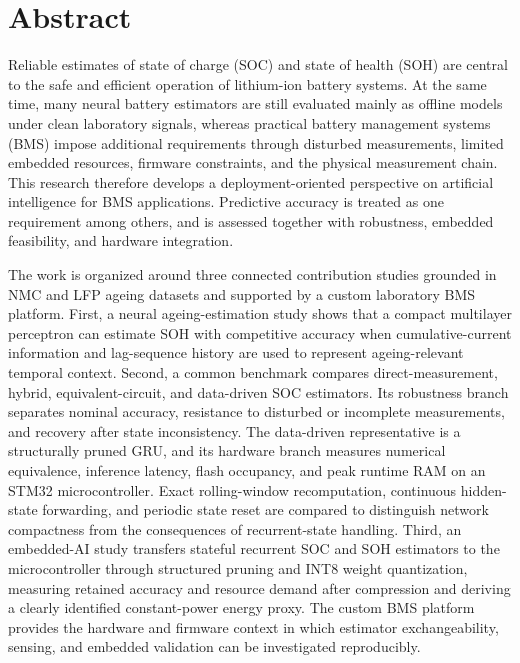 \documentclass[
    a4paper,
    12pt,
    titlepage,
    bibliography=totoc,
    twoside=on,
    parskip=false,
    numbers=noenddot,
    cleardoublepage=empty,
    DIV=12,
    BCOR=12.0mm,
    headheight=36pt,
    headings=openright
]{scrreprt}
\begin{document}
\chapter*{Abstract}
Reliable estimates of state of charge (SOC) and state of health (SOH) are central to the safe and efficient operation of lithium-ion battery systems. At the same time, many neural battery estimators are still evaluated mainly as offline models under clean laboratory signals, whereas practical battery management systems (BMS) impose additional requirements through disturbed measurements, limited embedded resources, firmware constraints, and the physical measurement chain. This research therefore develops a deployment-oriented perspective on artificial intelligence for BMS applications. Predictive accuracy is treated as one requirement among others, and is assessed together with robustness, embedded feasibility, and hardware integration.

The work is organized around three connected contribution studies grounded in NMC and LFP ageing datasets and supported by a custom laboratory BMS platform. First, a neural ageing-estimation study shows that a compact multilayer perceptron can estimate SOH with competitive accuracy when cumulative-current information and lag-sequence history are used to represent ageing-relevant temporal context. Second, a common benchmark compares direct-measurement, hybrid, equivalent-circuit, and data-driven SOC estimators. Its robustness branch separates nominal accuracy, resistance to disturbed or incomplete measurements, and recovery after state inconsistency. The data-driven representative is a structurally pruned GRU, and its hardware branch measures numerical equivalence, inference latency, flash occupancy, and peak runtime RAM on an STM32 microcontroller. Exact rolling-window recomputation, continuous hidden-state forwarding, and periodic state reset are compared to distinguish network compactness from the consequences of recurrent-state handling. Third, an embedded-AI study transfers stateful recurrent SOC and SOH estimators to the microcontroller through structured pruning and INT8 weight quantization, measuring retained accuracy and resource demand after compression and deriving a clearly identified constant-power energy proxy. The custom BMS platform provides the hardware and firmware context in which estimator exchangeability, sensing, and embedded validation can be investigated reproducibly.
\end{document}
